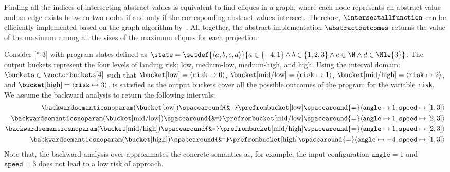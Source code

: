 Finding all the indices of intersecting abstract values is equivalent to find cliques in a graph, where each node represents an abstract value and an edge exists between two nodes if and only if the corresponding abstract values intersect.
Therefore, $\intersectallfunction$ can be efficiently implemented based on the graph algorithm by~.
All together, the abstract implementation $\abstractoutcomes$ returns the value of the maximum among all the sizes of the maximum cliques for each projection.
%

\begin{example}
  Consider [*-3] with program states defined as $\state=\setdef{\langle a, b, c, d \rangle}{a\in\{-4,1\}\land b\in\{1,2,3\}\land c\in\N \land d\in\Nle{3}}$. The output buckets represent the four levels of landing risk: low, medium-low, medium-high, and high. Using the interval domain: $\buckets \in \vectorbuckets[4]$ such that $\bucket[\textup{low}] = \langle \texttt{risk} \mapsto 0 \rangle$, $\bucket[\textup{mid\-/low}] = \langle \texttt{risk} \mapsto 1 \rangle$, $\bucket[\textup{mid\-/high}] = \langle \texttt{risk} \mapsto 2 \rangle$, and $\bucket[\textup{high}] = \langle \texttt{risk} \mapsto 3 \rangle$.
   is satisfied as the output buckets cover all the possible outcomes of the program for the variable \texttt{risk}.
  We assume the backward analysis to return the following intervals:
  \begin{align*}
    \backwardsemanticsnoparam(\bucket[\textup{low}]) \spacearound{&=} \prefrombucket[\textup{low}] \spacearound{=} \langle \texttt{angle} \mapsto 1, \texttt{speed} \mapsto [1, 3] \rangle \\
    \backwardsemanticsnoparam(\bucket[\textup{mid\-/low}]) \spacearound{&=} \prefrombucket[\textup{mid\-/low}] \spacearound{=} \langle \texttt{angle} \mapsto 1, \texttt{speed} \mapsto [2, 3] \rangle \\
    \backwardsemanticsnoparam(\bucket[\textup{mid\-/high}]) \spacearound{&=} \prefrombucket[\textup{mid\-/high}] \spacearound{=} \langle \texttt{angle} \mapsto 1, \texttt{speed} \mapsto [2, 3] \rangle \\
    \backwardsemanticsnoparam(\bucket[\textup{high}]) \spacearound{&=} \prefrombucket[\textup{high}] \spacearound{=} \langle \texttt{angle} \mapsto -4, \texttt{speed} \mapsto [1, 3] \rangle \\
  \end{align*}
  Note that, the backward analysis over-approximates the concrete semantics as, for example, the input configuration $\texttt{angle} = 1$ and $\texttt{speed} = 3$ does not lead to a low risk of approach.

\end{example}
